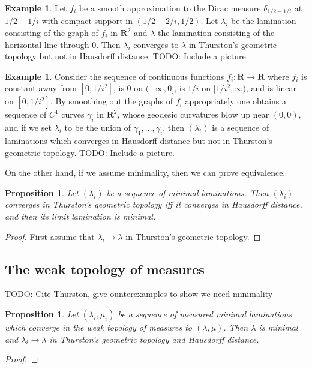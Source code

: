 \documentclass[reqno,10pt]{amsart}
\newcommand{\RR}{\mathbf{R}}
\newtheorem{proposition}[theorem]{Proposition}
\theoremstyle{definition}
\newtheorem{example}[theorem]{Example}
\numberwithin{equation}{section}
\begin{document}
\begin{example}
Let $f_i$ be a smooth approximation to the Dirac measure $\delta_{1/2-1/i}$ at $1/2 - 1/i$ with compact support in $(1/2 - 2/i, 1/2)$.
Let $\lambda_i$ be the lamination consisting of the graph of $f_i$ in $\RR^2$ and $\lambda$ the lamination consisting of the horizontal line through $0$.
Then $\lambda_i$ converges to $\lambda$ in Thurston's geometric topology but not in Hausdorff distance.
TODO: Include a picture
\end{example}

\begin{example}\label{Hausdorff does not imply Thurston}
Consider the sequence of continuous functions $f_i: \RR \to \RR$ where $f_i$ is constant away from $[0, 1/i^2]$, is $0$ on $(-\infty, 0]$, is $1/i$ on $[1/i^2, \infty)$, and is linear on $[0, 1/i^2]$.
By smoothing out the graphs of $f_i$ appropriately one obtains a sequence of $C^1$ curves $\gamma_i$ in $\RR^2$, whose geodesic curvatures blow up near $(0, 0)$, and if we set $\lambda_i$ to be the union of $\gamma_1, \dots, \gamma_i$, then $(\lambda_i)$ is a sequence of laminations which converges in Hausdorff distance but not in Thurston's geometric topology.
TODO: Include a picture.
\end{example}

On the other hand, if we assume minimality, then we can prove equivalence.

\begin{proposition}
Let $(\lambda_i)$ be a sequence of minimal laminations.
Then $(\lambda_i)$ converges in Thurston's geometric topology iff it converges in Hausdorff distance, and then its limit lamination is minimal.
\end{proposition}
\begin{proof}
First assume that $\lambda_i \to \lambda$ in Thurston's geometric topology.

\end{proof}



\subsection{The weak topology of measures}
TODO: Cite Thurston, give ounterexamples to show we need minimality

\begin{proposition}
Let $(\lambda_i, \mu_i)$ be a sequence of measured minimal laminations which converge in the weak topology of measures to $(\lambda, \mu)$.
Then $\lambda$ is minimal and $\lambda_i \to \lambda$ in Thurston's geometric topology and Hausdorff distance.
\end{proposition}
\begin{proof}

\end{proof}
\end{document}
